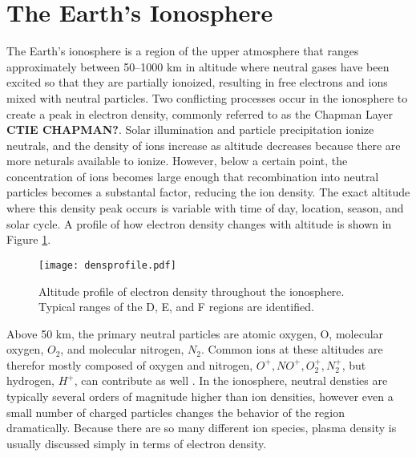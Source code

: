 \section{The Earth's Ionosphere}
\label{sec:ionosphere}
The Earth's ionosphere is a region of the upper atmosphere that ranges approximately between 50--1000 km in altitude where neutral gases have been excited so that they are partially ionoized, resulting in free electrons and ions mixed with neutral particles.  Two conflicting processes occur in the ionosphere to create a peak in electron density, commonly referred to as the Chapman Layer \textbf{CTIE CHAPMAN?}.  Solar illumination and particle precipitation ionize neutrals, and the density of ions increase as altitude decreases because there are more neturals available to ionize.  However, below a certain point, the concentration of ions becomes large enough that recombination into neutral particles becomes a substantal factor, reducing the ion density.  The exact altitude where this density peak occurs is variable with time of day, location, season, and solar cycle.  A profile of how electron density changes with altitude is shown in Figure \ref{fig:densprofile}.

\begin{figure}
	\texttt{[image: densprofile.pdf]}
	\caption{Altitude profile of electron density throughout the ionosphere.  Typical ranges of the D, E, and F regions are identified.}
	\label{fig:densprofile}
\end{figure}

Above 50 km, the primary neutral particles are atomic oxygen, O, molecular oxygen, \(O_2\), and molecular nitrogen, \(N_2\).  Common ions at these altitudes are therefor mostly composed of oxygen and nitrogen, \(O^+, NO^+, O_2^+, N_2^+\), but hydrogen, \(H^+\), can contribute as well \citep{Kelley2009}.  In the ionosphere, neutral densties are typically several orders of magnitude higher than ion densities, however even a small number of charged particles changes the behavior of the region dramatically.  Because there are so many different ion species, plasma density is usually discussed simply in terms of electron density.

